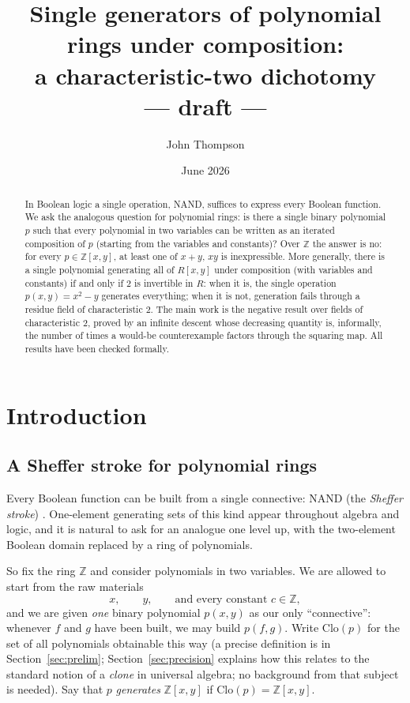 \documentclass[11pt]{article}
\title{Single generators of polynomial rings under composition:\\
a characteristic-two dichotomy\\[1ex] {\large\normalfont --- draft ---}}
\author{John Thompson}
\date{June 2026}
\theoremstyle{definition}
\theoremstyle{remark}
\newcommand{\Z}{\mathbb{Z}}
\newcommand{\Clo}{\mathrm{Clo}}
\begin{document}
\maketitle

\begin{abstract}
In Boolean logic a single operation, NAND, suffices to express every
Boolean function.  We ask the analogous question for polynomial rings:
is there a single binary polynomial $p$ such that every polynomial in
two variables can be written as an iterated composition of $p$
(starting from the variables and constants)?  Over $\Z$ the answer is
no: for every $p \in \Z[x,y]$, at least one of $x+y$, $xy$ is
inexpressible.  More generally, there is a single polynomial
generating all of $R[x,y]$ under composition (with variables and
constants) if and only if $2$ is invertible in $R$: when it is, the
single operation $p(x,y) = x^2 - y$ generates everything; when it is
not, generation fails through a residue field of characteristic $2$.
The main work is the negative result
over fields of characteristic $2$, proved by an infinite descent
whose decreasing quantity is, informally, the number of times a
would-be counterexample factors through the squaring map.  All
results have been checked formally.
\end{abstract}

\section{Introduction}

\subsection{A Sheffer stroke for polynomial rings}

Every Boolean function can be built from a single connective: NAND
(the \emph{Sheffer stroke}) \cite{Sheffer,Post}.  One-element generating sets of this kind
appear throughout algebra and logic, and it is natural to ask for an
analogue one level up, with the two-element Boolean domain replaced by
a ring of polynomials.

So fix the ring $\Z$ and consider polynomials in two variables.  We
are allowed to start from the raw materials
\[
  x, \qquad y, \qquad \text{and every constant } c \in \Z,
\]
and we are given \emph{one} binary polynomial $p(x,y)$ as our only
``connective'': whenever $f$ and $g$ have been built, we may build
$p(f,g)$.  Write $\Clo(p)$ for the set of all polynomials obtainable
this way (a precise definition is in Section~\ref{sec:prelim};
Section~\ref{sec:precision} explains how this relates to the standard
notion of a \emph{clone} in universal algebra; no background from
that subject is needed).  Say that $p$ \emph{generates} $\Z[x,y]$ if
$\Clo(p) = \Z[x,y]$.
\end{document}
